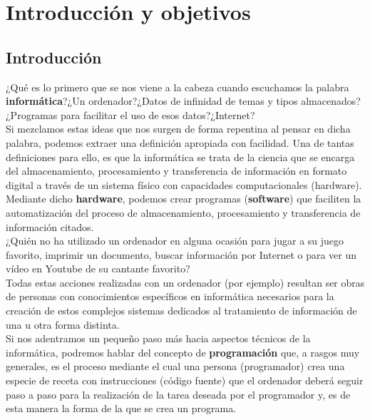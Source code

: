\chapter[Capítulo 1. Introducción y objetivos]{Introducción y objetivos}

\section{Introducción}

¿Qué es lo primero que se nos viene a la cabeza cuando escuchamos la palabra \textbf{informática}?¿Un ordenador?¿Datos de infinidad de temas y tipos almacenados?¿Programas para facilitar el uso de esos datos?¿Internet?\\

Si mezclamos estas ideas que nos surgen de forma repentina al pensar en dicha palabra, podemos extraer una definición apropiada con facilidad. Una de tantas definiciones para ello, es que la informática se trata de la ciencia que se encarga del almacenamiento, procesamiento y transferencia de información en formato digital a través de un sistema físico con capacidades computacionales (hardware). Mediante dicho \textbf{hardware}, podemos crear programas (\textbf{software}) que faciliten la automatización del proceso de almacenamiento, procesamiento y transferencia de información citados.\\
¿Quién no ha utilizado un ordenador en alguna ocasión para jugar a su juego favorito, imprimir un documento, buscar información por Internet o para ver un vídeo en Youtube de su cantante favorito?\\
Todas estas acciones realizadas con un ordenador (por ejemplo) resultan ser obras de personas con conocimientos específicos en informática necesarios para la creación de estos complejos sistemas dedicados al tratamiento de información de una u otra forma distinta.\\

Si nos adentramos un pequeño paso más hacia aspectos técnicos de la informática, podremos hablar del concepto de \textbf{programación} que, a rasgos muy generales, es el proceso mediante el cual una persona (programador) crea una especie de receta con instrucciones (código fuente) que el ordenador deberá seguir paso a paso para la realización de la tarea deseada por el programador y, es de esta manera la forma de la que se crea un programa.\\

